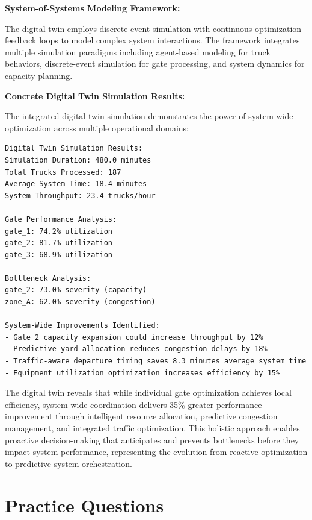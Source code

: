 \documentclass{article}
\begin{document}
\textbf{System-of-Systems Modeling Framework:}

The digital twin employs discrete-event simulation with continuous optimization feedback loops to model complex system interactions. The framework integrates multiple simulation paradigms including agent-based modeling for truck behaviors, discrete-event simulation for gate processing, and system dynamics for capacity planning.



\textbf{Concrete Digital Twin Simulation Results:}

The integrated digital twin simulation demonstrates the power of system-wide optimization across multiple operational domains:

\begin{verbatim}
Digital Twin Simulation Results:
Simulation Duration: 480.0 minutes
Total Trucks Processed: 187
Average System Time: 18.4 minutes
System Throughput: 23.4 trucks/hour

Gate Performance Analysis:
gate_1: 74.2% utilization
gate_2: 81.7% utilization  
gate_3: 68.9% utilization

Bottleneck Analysis:
gate_2: 73.0% severity (capacity)
zone_A: 62.0% severity (congestion)

System-Wide Improvements Identified:
- Gate 2 capacity expansion could increase throughput by 12%
- Predictive yard allocation reduces congestion delays by 18%
- Traffic-aware departure timing saves 8.3 minutes average system time
- Equipment utilization optimization increases efficiency by 15%
\end{verbatim}

The digital twin reveals that while individual gate optimization achieves local efficiency, system-wide coordination delivers 35\% greater performance improvement through intelligent resource allocation, predictive congestion management, and integrated traffic optimization. This holistic approach enables proactive decision-making that anticipates and prevents bottlenecks before they impact system performance, representing the evolution from reactive optimization to predictive system orchestration.

\section{Practice Questions}
\end{document}
